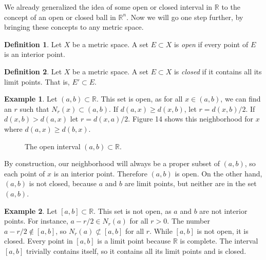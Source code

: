 \documentclass{article}
\newcommand{\R}{\mathbb{R}}
\theoremstyle{definition}
\newtheorem{definition}{Definition}[section]
\newtheorem{example}{Example}[section]
\begin{document}
We already generalized the idea of some open or closed interval in $ \R $ to the concept of an open or closed ball in $ \R^n $. Now we will go one step further, by bringing these concepts to any metric space. 
\begin{definition}
	Let $ X $ be a metric space. A set $ E\subset X $ is \textit{\color{red}open} if every point of $ E $ is an interior point.  
\end{definition}
\begin{definition}
	Let $ X $ be a metric space. A set $ E\subset X $ is \textit{\color{red}closed} if it contains all its limit points. That is, $ E'\subset E $. 
\end{definition}
\begin{example}
	Let $ (a,b)\subset\R $. This set is open, as for all $ x\in(a,b) $, we can find an $ r $ such that $ N_r(x)\subset(a,b) $. If $ d(a,x)\ge d(x,b) $, let $ r=d(x,b)/2 $. If $ d(x,b)>d(a,x) $ let $ r=d(x,a)/2 $.  Figure 14 shows this neighborhood for $ x $ where $ d(a,x)\ge d(b,x) $.
		\begin{figure}[h]
		\centering
		\caption{The open interval $ (a,b)\subset \R $.}
	\end{figure}
By construction, our neighborhood will always be a proper subset of $ (a,b) $, so each point of $ x $ is an interior point. Therefore $ (a,b) $ is open. On the other hand, $ (a,b) $ is not closed, because $ a $ and $ b $ are limit points, but neither are in the set $ (a,b) $.
\end{example}
\begin{example}
	Let $ [a,b]\subset\R $. This set is not open, as $ a $ and $ b $ are not interior points. For instance, $ a-r/2\in N_r(a) $ for all $ r>0 $. The number $ a-r/2\notin[a,b] $, so $ N_r(a)\not\subset[a,b] $ for all $ r $. While $ [a,b] $ is not open, it is closed. Every point in $ [a,b] $ is a limit point because $ \R $ is complete. The interval $ [a,b] $ trivially contains itself, so it contains all its limit points and is closed. 
\end{example}
\end{document}
